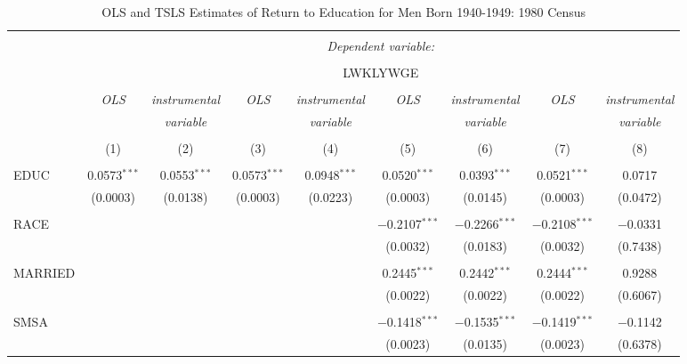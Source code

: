\documentclass{article}
\begin{document}
\begin{sidewaystable}[!htbp] \centering 
  \caption{OLS and TSLS Estimates of Return to Education for Men Born 
    1940-1949: 1980 Census} 
  \label{} 
\begin{tabular}{@{\extracolsep{5pt}}lcccccccc} 
\\[-1.8ex]\hline 
\hline \\[-1.8ex] 
 & \multicolumn{8}{c}{\textit{Dependent variable:}} \\ 
\cline{2-9} 
\\[-1.8ex] & \multicolumn{8}{c}{LWKLYWGE} \\ 
\\[-1.8ex] & \textit{OLS} & \textit{instrumental} & \textit{OLS} & \textit{instrumental} & \textit{OLS} & \textit{instrumental} & \textit{OLS} & \textit{instrumental} \\ 
 & \textit{} & \textit{variable} & \textit{} & \textit{variable} & \textit{} & \textit{variable} & \textit{} & \textit{variable} \\ 
\\[-1.8ex] & (1) & (2) & (3) & (4) & (5) & (6) & (7) & (8)\\ 
\hline \\[-1.8ex] 
 EDUC & 0.0573$^{***}$ & 0.0553$^{***}$ & 0.0573$^{***}$ & 0.0948$^{***}$ & 0.0520$^{***}$ & 0.0393$^{***}$ & 0.0521$^{***}$ & 0.0717 \\ 
  & (0.0003) & (0.0138) & (0.0003) & (0.0223) & (0.0003) & (0.0145) & (0.0003) & (0.0472) \\ 
  & & & & & & & & \\ 
 RACE &  &  &  &  & $-$0.2107$^{***}$ & $-$0.2266$^{***}$ & $-$0.2108$^{***}$ & $-$0.0331 \\ 
  &  &  &  &  & (0.0032) & (0.0183) & (0.0032) & (0.7438) \\ 
  & & & & & & & & \\ 
 MARRIED &  &  &  &  & 0.2445$^{***}$ & 0.2442$^{***}$ & 0.2444$^{***}$ & 0.9288 \\ 
  &  &  &  &  & (0.0022) & (0.0022) & (0.0022) & (0.6067) \\ 
  & & & & & & & & \\ 
 SMSA &  &  &  &  & $-$0.1418$^{***}$ & $-$0.1535$^{***}$ & $-$0.1419$^{***}$ & $-$0.1142 \\ 
  &  &  &  &  & (0.0023) & (0.0135) & (0.0023) & (0.6378) \\ 

\end{tabular}
\end{sidewaystable}
\end{document}
